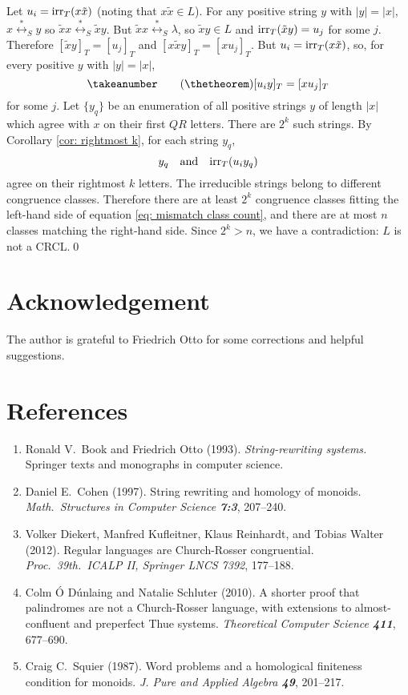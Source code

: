 \documentclass[12pt,a4paper]{article}
\newcommand{\thuecong}{{\overset{*}{\leftrightarrow}}}
\newcommand{\irr}{{\text{\rm irr}}}
\numberwithin{equation}{section}
\newcommand{\be}{\begin{equation*}}
\newcommand{\ee}{\end{equation*}}
\begin{document}
Let $u_i = \irr_T(x\tilde{x})$ (noting that $x\tilde{x}\in L$).
For any positive string $y$ with $|y|=|x|$, $x\thuecong_S y$
so $\tilde{x}x \thuecong_S \tilde{x}y$.  But
$\tilde{x}x \thuecong_S \lambda$, so
$\tilde{x} y \in L$ and $\irr_T(\tilde{x}y) = u_j$ for some $j$.
Therefore $[\tilde{x}y]_T = [u_j]_T$ and
$[x\tilde{x}y]_T = [x u_j]_T$. But $u_i = \irr_T(x\tilde{x})$,
so, for every positive $y$ with $|y|=|x|$,
\be
\takeanumber
\tag{\thetheorem}
\label{eq: mismatch class count}
[u_iy]_T = [x u_j]_T
\ee
for some $j$.
Let $\{y_q\}$ be an enumeration of all positive strings $y$
of length $|x|$ which agree with $x$ on their first $QR$
letters.  There are $2^k$ such strings. By Corollary
\ref{cor: rightmost k}, for each string $y_q$,
\be
y_q \quad\text{\rm and}\quad  \irr_T(u_i y_q)
\ee
agree on their rightmost
$k$ letters.  The irreducible strings belong to
different congruence classes. Therefore there are
at least $2^k$ congruence classes fitting the left-hand
side of equation \ref{eq: mismatch class count}, and there
are at most $n$ classes matching the right-hand side.
Since $2^k>n$, we have  a contradiction: $L$ is not
a CRCL.\qed

\section{Acknowledgement}
The author is grateful to Friedrich Otto
for some corrections and helpful suggestions.

\section{References}
\label{references} \begin{enumerate}
\item
\label{bo}
Ronald V.\ Book and Friedrich Otto (1993). {\em String-rewriting
systems.} Springer texts and monographs in computer science.
\item
\label{cohen}
Daniel E.\ Cohen (1997). String rewriting and homology of monoids.
{\em Math.\ Structures in Computer Science \bf 7:3}, 207--240.
\item
\label{dkrw}
Volker Diekert, Manfred Kufleitner, Klaus Reinhardt, and
Tobias  Walter (2012).
Regular languages are Church-Rosser congruential.
{\em Proc.\ 39th.\ ICALP II, Springer LNCS 7392}, 177--188.
\item
\label{ods}
Colm \'O D\'unlaing and Natalie Schluter (2010).
A shorter proof that palindromes are not a Church-Rosser
language, with extensions to almost-confluent and preperfect Thue systems.
{\em Theoretical Computer Science \bf 411}, 677--690.
\item
\label{squier}
Craig C.\ Squier (1987). Word problems and a homological finiteness
condition for monoids. {\em J. Pure and Applied Algebra \bf 49}, 201--217.
\end{enumerate}
\end{document}

